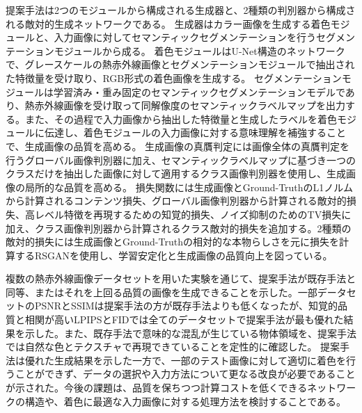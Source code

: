 提案手法は2つのモジュールから構成される生成器と、2種類の判別器から構成される敵対的生成ネットワークである。
生成器はカラー画像を生成する着色モジュールと、入力画像に対してセマンティックセグメンテーションを行うセグメンテーションモジュールから成る。
着色モジュールはU-Net構造のネットワークで、グレースケールの熱赤外線画像とセグメンテーションモジュールで抽出された特徴量を受け取り、RGB形式の着色画像を生成する。
セグメンテーションモジュールは学習済み・重み固定のセマンティックセグメンテーションモデルであり、熱赤外線画像を受け取って同解像度のセマンティックラベルマップを出力する。また、その過程で入力画像から抽出した特徴量と生成したラベルを着色モジュールに伝達し、着色モジュールの入力画像に対する意味理解を補強することで、生成画像の品質を高める。
生成画像の真贋判定には画像全体の真贋判定を行うグローバル画像判別器に加え、セマンティックラベルマップに基づき一つのクラスだけを抽出した画像に対して適用するクラス画像判別器を使用し、生成画像の局所的な品質を高める。
損失関数には生成画像とGround-TruthのL1ノルムから計算されるコンテンツ損失、グローバル画像判別器から計算される敵対的損失、高レベル特徴を再現するための知覚的損失、ノイズ抑制のためのTV損失に加え、クラス画像判別器から計算されるクラス敵対的損失を追加する。2種類の敵対的損失には生成画像とGround-Truthの相対的な本物らしさを元に損失を計算するRSGANを使用し、学習安定化と生成画像の品質向上を図っている。

複数の熱赤外線画像データセットを用いた実験を通じて、提案手法が既存手法と同等、またはそれを上回る品質の画像を生成できることを示した。一部データセットのPSNRとSSIMは提案手法の方が既存手法よりも低くなったが、知覚的品質と相関が高いLPIPSとFIDでは全てのデータセットで提案手法が最も優れた結果を示した。また、既存手法で意味的な混乱が生じている物体領域を、提案手法では自然な色とテクスチャで再現できていることを定性的に確認した。
提案手法は優れた生成結果を示した一方で、一部のテスト画像に対して適切に着色を行うことができず、データの選択や入力方法について更なる改良が必要であることが示された。今後の課題は、品質を保ちつつ計算コストを低くできるネットワークの構造や、着色に最適な入力画像に対する処理方法を検討することである。




